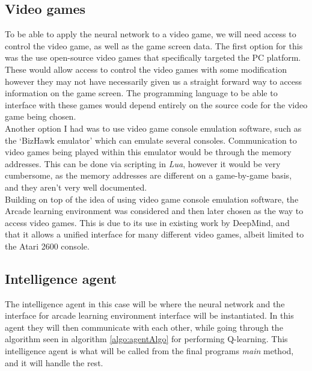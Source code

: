 \documentclass[10pt]{article}
\begin{document}
	\subsection{Video games}
		To be able to apply the neural network to a video game, we will need access to control the video game, as well as the game screen data. The first option for this was the use open-source video games that specifically targeted the PC platform. These would allow access to control the video games with some modification however they may not have necessarily given us a straight forward way to access information on the game screen. The programming language to be able to interface with these games would depend entirely on the source code for the video game being chosen.\\
		
		Another option I had was to use video game console emulation software, such as the `BizHawk emulator'\cite{biz} which can emulate several consoles. Communication to video games being played within this emulator would be through the memory addresses. This can be done via scripting in \textit{Lua}, however it would be very cumbersome, as the memory addresses are different on a game-by-game basis, and they aren't very well documented.\\
		
		Building on top of the idea of using video game console emulation software, the Arcade learning environment was considered and then later chosen as the way to access video games. This is due to its use in existing work by DeepMind, and that it allows a unified interface for many different video games, albeit limited to the Atari 2600 console.\\	
	
	\medskip	
	
	\subsection{Intelligence agent}
	
		The intelligence agent in this case will be where the neural network and the interface for arcade learning environment interface will be instantiated. In this agent they will then communicate with each other, while going through the algorithm seen in algorithm \ref{algo:agentAlgo} for performing Q-learning. This intelligence agent is what will be called from the final programs \textit{main} method, and it will handle the rest.\\
		
\end{document}
